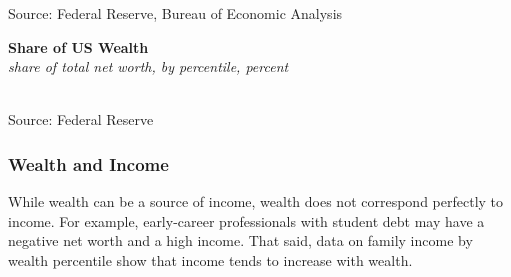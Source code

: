 \documentclass{report}
\makeatletter
\newcommand{\tbllink}[1]{\href{https://raw.githubusercontent.com/bdecon/US-chartbook/master/chartbook/data/#1}{\faTable}}
\newcommand*\short[1]{\expandafter\@gobbletwo\number\numexpr#1\relax}
\newcommand{\absnode}[3]{\node[below right, align=left] at (axis cs: #1,#2) {#3};}
\newcommand{\shdateaxisticks}{
		date coordinates in=x, axis line style={draw=none},
		xmax={2023-11-30},
		max space between ticks=40,	    
		xtick={{1990-01-01}, {1995-01-01}, {2000-01-01}, 
			{2005-01-01}, {2010-01-01}, {2015-01-01}, {2020-01-01}},
		minor xtick={},
		enlarge y limits={0.06}, enlarge x limits={0.01},
		xticklabel style={align=center, yshift=-2pt}, tick label style={inner sep=0pt},
		}
\newcommand{\bbar}[2]{extra #1 ticks = {{#2}}, extra #1 tick labels = ,
		extra #1 tick style = {grid=major, grid style={thick, black!25}},}
\newcommand{\thickline}[4]{\addplot[ultra thick, no markers, color=#1] 
		table [x=#2, y=#3, col sep=comma] {#4};	}
\newcommand{\rbars}{
		\fill[color=black!10] (axis cs:{1990-07-01},\pgfkeysvalueof{/pgfplots/ymin}) rectangle 
			(axis cs:{1991-03-01}, \pgfkeysvalueof{/pgfplots/ymax});
		\fill[color=black!10] (axis cs:{2007-12-01},\pgfkeysvalueof{/pgfplots/ymin}) rectangle 
			(axis cs:{2009-07-01}, \pgfkeysvalueof{/pgfplots/ymax});
		\fill[color=black!10] (axis cs:{2001-03-01},\pgfkeysvalueof{/pgfplots/ymin}) rectangle 
			(axis cs:{2001-11-01}, \pgfkeysvalueof{/pgfplots/ymax});
		\fill[color=black!10] (axis cs:{2020-02-01},\pgfkeysvalueof{/pgfplots/ymin}) rectangle 
			(axis cs:{2020-05-01}, \pgfkeysvalueof{/pgfplots/ymax});}
\makeatother
\begin{document}
{\begin{minipage}{0.76\textwidth}
\footnotesize{Source: Federal Reserve, Bureau of Economic Analysis} \hfill \tbllink{rdpi_nw.csv}
\end{minipage}
\newpage
\begin{minipage}{0.33\textwidth}  
\small 
\end{minipage}\hspace{6mm}
\begin{minipage}{0.39\textwidth}
\normalsize \textbf{Share of US Wealth}\\
\footnotesize{\textit{share of total net worth, by percentile, percent}}\\
\hspace*{-1mm} \\
\footnotesize{Source: Federal Reserve} \hfill \tbllink{dfa_nw_sh.csv} \ \ \ 
\end{minipage}
\vspace{3mm}

\begin{minipage}{0.76\textwidth}
\subsubsection*{Wealth and Income}
\small While wealth can be a source of income, wealth does not correspond perfectly to income. For example, early-career professionals with student debt may have a negative net worth and a high income. That said, data on family income by wealth percentile show that income tends to increase with wealth. 


\end{minipage}}
\end{document}
